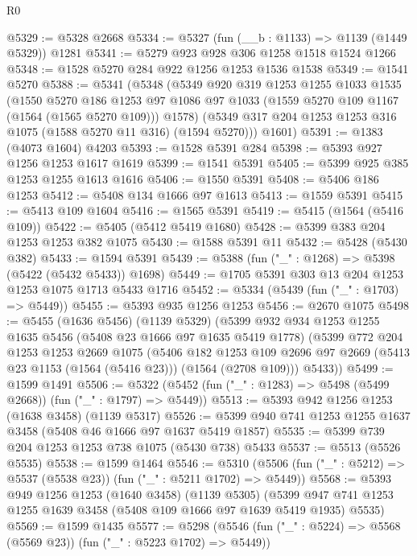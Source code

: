 \begin{lexlean}{R0}
\begin{coremodule}
@5329 := @5328 @2668
@5334 := @5327 (fun (__b : @1133) => @1139 (@1449 @5329)) @1281
@5341 := @5279 @923 @928 @306 @1258 @1518 @1524 @1266
@5348 := @1528 @5270 @284 @922 @1256 @1253 @1536 @1538
@5349 := @1541 @5270
@5388 := @5341
    (@5348
      (@5349
        @920
        @319
        @1253
        @1255
        @1033
        @1535
        (@1550
          @5270
          @186
          @1253
          @97
          @1086
          @97
          @1033
          (@1559 @5270 @109 @1167 (@1564 (@1565 @5270 @109)))
          @1578)
        (@5349 @317 @204 @1253 @1253 @316 @1075 (@1588 @5270 @11 @316) (@1594 @5270)))
      @1601)
@5391 := @1383 (@4073 @1604) @4203
@5393 := @1528 @5391 @284
@5398 := @5393 @927 @1256 @1253 @1617 @1619
@5399 := @1541 @5391
@5405 := @5399 @925 @385 @1253 @1255 @1613 @1616
@5406 := @1550 @5391
@5408 := @5406 @186 @1253
@5412 := @5408 @134 @1666 @97 @1613
@5413 := @1559 @5391
@5415 := @5413 @109 @1604
@5416 := @1565 @5391
@5419 := @5415 (@1564 (@5416 @109))
@5422 := @5405 (@5412 @5419 @1680)
@5428 := @5399 @383 @204 @1253 @1253 @382 @1075
@5430 := @1588 @5391 @11
@5432 := @5428 (@5430 @382)
@5433 := @1594 @5391
@5439 := @5388 (fun ("_" : @1268) => @5398 (@5422 (@5432 @5433)) @1698)
@5449 := @1705 @5391 @303 @13 @204 @1253 @1253 @1075 @1713 @5433 @1716
@5452 := @5334 (@5439 (fun ("_" : @1703) => @5449))
@5455 := @5393 @935 @1256 @1253
@5456 := @2670 @1075
@5498 := @5455
    (@1636 @5456)
    (@1139 @5329)
    (@5399
      @932
      @934
      @1253
      @1255
      @1635
      @5456
      (@5408 @23 @1666 @97 @1635 @5419 @1778)
      (@5399
        @772
        @204
        @1253
        @1253
        @2669
        @1075
        (@5406
          @182
          @1253
          @109
          @2696
          @97
          @2669
          (@5413 @23 @1153 (@1564 (@5416 @23)))
          (@1564 (@2708 @109)))
        @5433))
@5499 := @1599 @1491
@5506 := @5322 (@5452 (fun ("_" : @1283) => @5498 (@5499 @2668)) (fun ("_" : @1797) => @5449))
@5513 := @5393 @942 @1256 @1253 (@1638 @3458) (@1139 @5317)
@5526 := @5399 @940 @741 @1253 @1255 @1637 @3458 (@5408 @46 @1666 @97 @1637 @5419 @1857)
@5535 := @5399 @739 @204 @1253 @1253 @738 @1075 (@5430 @738) @5433
@5537 := @5513 (@5526 @5535)
@5538 := @1599 @1464
@5546 := @5310 (@5506 (fun ("_" : @5212) => @5537 (@5538 @23)) (fun ("_" : @5211 @1702) => @5449))
@5568 := @5393
    @949
    @1256
    @1253
    (@1640 @3458)
    (@1139 @5305)
    (@5399 @947 @741 @1253 @1255 @1639 @3458 (@5408 @109 @1666 @97 @1639 @5419 @1935) @5535)
@5569 := @1599 @1435
@5577 := @5298 (@5546 (fun ("_" : @5224) => @5568 (@5569 @23)) (fun ("_" : @5223 @1702) => @5449))

\end{coremodule}
\end{lexlean}
